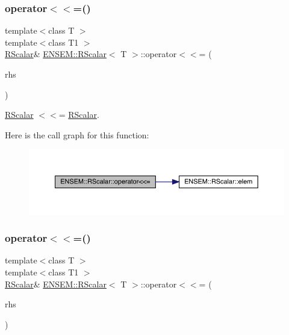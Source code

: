 \subsubsection{\texorpdfstring{operator$<$$<$=()}{operator<<=()}\hspace{0.1cm}{\footnotesize\ttfamily [2/3]}}
{\footnotesize\ttfamily template$<$class T $>$ \\
template$<$class T1 $>$ \\
\mbox{\hyperlink{classENSEM_1_1RScalar}{R\+Scalar}}\& \mbox{\hyperlink{classENSEM_1_1RScalar}{E\+N\+S\+E\+M\+::\+R\+Scalar}}$<$ T $>$\+::operator$<$$<$= (\begin{DoxyParamCaption}\item[{const \mbox{\hyperlink{classENSEM_1_1RScalar}{R\+Scalar}}$<$ T1 $>$ \&}]{rhs }\end{DoxyParamCaption})\hspace{0.3cm}{\ttfamily [inline]}}



\mbox{\hyperlink{classENSEM_1_1RScalar}{R\+Scalar}} $<$$<$= \mbox{\hyperlink{classENSEM_1_1RScalar}{R\+Scalar}}. 

Here is the call graph for this function\+:
\nopagebreak
\begin{figure}[H]
\begin{center}
\leavevmode
\includegraphics[width=350pt]{d0/d8c/classENSEM_1_1RScalar_a4f12bedac2ac4848354e3c3018f6c9aa_cgraph}
\end{center}
\end{figure}
\mbox{\label{classENSEM_1_1RScalar_a4f12bedac2ac4848354e3c3018f6c9aa}} 
\subsubsection{\texorpdfstring{operator$<$$<$=()}{operator<<=()}\hspace{0.1cm}{\footnotesize\ttfamily [3/3]}}
{\footnotesize\ttfamily template$<$class T $>$ \\
template$<$class T1 $>$ \\
\mbox{\hyperlink{classENSEM_1_1RScalar}{R\+Scalar}}\& \mbox{\hyperlink{classENSEM_1_1RScalar}{E\+N\+S\+E\+M\+::\+R\+Scalar}}$<$ T $>$\+::operator$<$$<$= (\begin{DoxyParamCaption}\item[{const \mbox{\hyperlink{classENSEM_1_1RScalar}{R\+Scalar}}$<$ T1 $>$ \&}]{rhs }\end{DoxyParamCaption})\hspace{0.3cm}{\ttfamily [inline]}}



